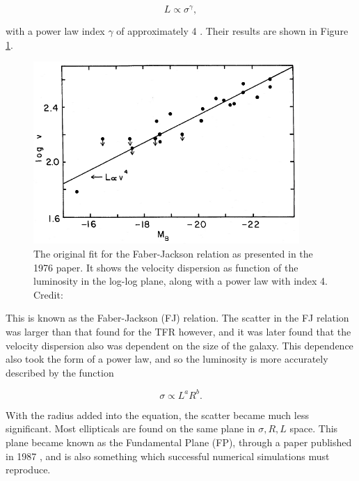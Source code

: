 \begin{equation}
    L \propto \sigma^{\gamma},
\end{equation}

with a power law index $\gamma$ of approximately 4 \parencite{FaberJackson1976}. Their results are shown in Figure \ref{faber_jackson}.

\begin{figure}
    \centering
    \includegraphics[width=0.9\textwidth]{images/faber_jackson.png}
    \caption{The original fit for the Faber-Jackson relation as presented in the 1976 paper. It shows the velocity dispersion as function of the luminosity in the log-log plane, along with a power law with index 4. Credit: \cite{FaberJackson1976}}
    \label{faber_jackson}
\end{figure}

This is known as the Faber-Jackson (FJ) relation. The scatter in the FJ relation was larger than that found for the TFR however, and it was later found that the velocity dispersion also was dependent on the size of the galaxy. This dependence also took the form of a power law, and so the luminosity is more accurately described by the function

\begin{equation}
    \sigma \propto L^a R^b.
\end{equation}

With the radius added into the equation, the scatter became much less significant. Most ellipticals are found on the same plane in ${\sigma, R, L}$ space. This plane became known as the Fundamental Plane (FP), through a paper published in 1987 \parencite{Djorgovski1987}, and is also something which successful numerical simulations must reproduce.

